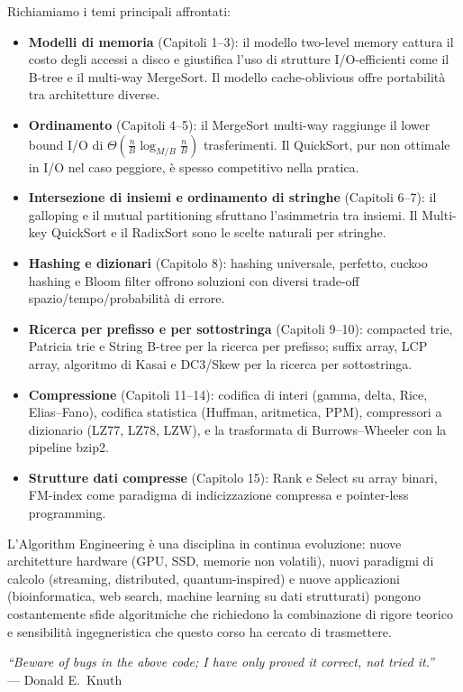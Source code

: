 \documentclass[12pt, a4paper, oneside]{book}
\theoremstyle{plain}
\theoremstyle{definition}
\theoremstyle{remark}
\newcommand{\Th}[1]{\Theta\!\left(#1\right)}
\begin{document}
Richiamiamo i temi principali affrontati:

\begin{itemize}
  \item \textbf{Modelli di memoria} (Capitoli 1--3): il modello two-level memory cattura il costo degli accessi a disco e giustifica l'uso di strutture I/O-efficienti come il B-tree e il multi-way MergeSort. Il modello cache-oblivious offre portabilità tra architetture diverse.

  \item \textbf{Ordinamento} (Capitoli 4--5): il MergeSort multi-way raggiunge il lower bound I/O di $\Th{\frac{n}{B} \log_{M/B} \frac{n}{B}}$ trasferimenti. Il QuickSort, pur non ottimale in I/O nel caso peggiore, è spesso competitivo nella pratica.

  \item \textbf{Intersezione di insiemi e ordinamento di stringhe} (Capitoli 6--7): il galloping e il mutual partitioning sfruttano l'asimmetria tra insiemi. Il Multi-key QuickSort e il RadixSort sono le scelte naturali per stringhe.

  \item \textbf{Hashing e dizionari} (Capitolo 8): hashing universale, perfetto, cuckoo hashing e Bloom filter offrono soluzioni con diversi trade-off spazio/tempo/probabilità di errore.

  \item \textbf{Ricerca per prefisso e per sottostringa} (Capitoli 9--10): compacted trie, Patricia trie e String B-tree per la ricerca per prefisso; suffix array, LCP array, algoritmo di Kasai e DC3/Skew per la ricerca per sottostringa.

  \item \textbf{Compressione} (Capitoli 11--14): codifica di interi (gamma, delta, Rice, Elias--Fano), codifica statistica (Huffman, aritmetica, PPM), compressori a dizionario (LZ77, LZ78, LZW), e la trasformata di Burrows--Wheeler con la pipeline bzip2.

  \item \textbf{Strutture dati compresse} (Capitolo 15): Rank e Select su array binari, FM-index come paradigma di indicizzazione compressa e pointer-less programming.
\end{itemize}

L'Algorithm Engineering è una disciplina in continua evoluzione: nuove architetture hardware (GPU, SSD, memorie non volatili), nuovi paradigmi di calcolo (streaming, distributed, quantum-inspired) e nuove applicazioni (bioinformatica, web search, machine learning su dati strutturati) pongono costantemente sfide algoritmiche che richiedono la combinazione di rigore teorico e sensibilità ingegneristica che questo corso ha cercato di trasmettere.

\vspace{1cm}
\begin{center}
\emph{``Beware of bugs in the above code; I have only proved it correct, not tried it.''}\\[0.5em]
--- Donald E.\ Knuth
\end{center}
\end{document}
